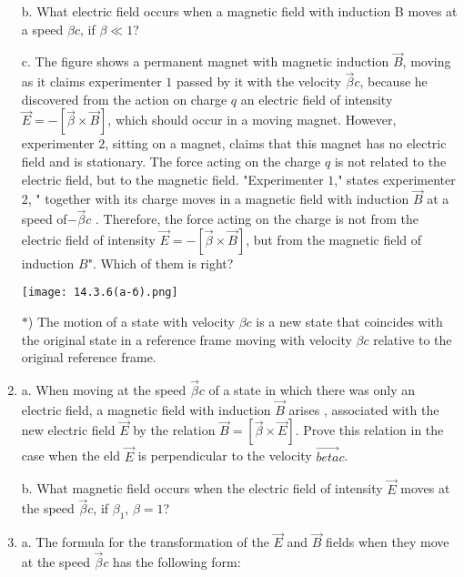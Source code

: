 \documentclass{article}
\begin{document}
\begin{enumerate}[label=14.3.\arabic*]
b. What electric field occurs when a magnetic field with induction B moves at a speed $\beta c$, if $\beta \ll 1$?

c. The figure shows a permanent magnet with magnetic induction $\overrightarrow{B}$, moving as it claims experimenter $1$ passed by it with the velocity $\overrightarrow{\beta}c$, because he discovered from the action on charge $q$ an electric field of intensity $\overrightarrow{E} = -[\overrightarrow{\beta} \times \overrightarrow{B} ]$, which should occur in a moving magnet. However, experimenter $2$, sitting on a magnet, claims that this magnet has no electric field and is stationary. The force acting on the charge $q$ is not related to the electric field, but to the magnetic field. "Experimenter $1$," states experimenter $2$, " together with its charge moves in a magnetic field with induction $\overrightarrow{B}$ at a speed of$- \overrightarrow{\beta} c$ . Therefore, the force acting on the charge is not from the electric field of intensity $\overrightarrow{E} = -[\overrightarrow{\beta} \times \overrightarrow{B}]$, but from the magnetic field of induction $B$". Which of them is right? 

\begin{center}
    \texttt{[image: 14.3.6(а-б).png]}
\end{center}

$\ast$) The motion of a state with velocity $\beta c$ is a new state that coincides with the original state in a reference frame moving with velocity $\beta c$ relative to the original reference frame.

\item a. When moving at the speed $\overrightarrow{\beta}c$ of a state in which there was only an electric field, a magnetic field with induction $\overrightarrow{B}$ arises , associated with the new electric field $\overrightarrow{E}$ by the relation $\overrightarrow{B} = [\overrightarrow{\beta} \times \overrightarrow{E} ]$. Prove this relation in the case when the eld $\overrightarrow{E}$ is perpendicular to the velocity $\overrightarrow{beta} c$. 

b. What magnetic field occurs when the electric field of intensity $\overrightarrow{E}$ moves at the speed $\overrightarrow{\beta} c$, if $\beta_1$, $\beta = 1$?


\item a. The formula for the transformation of the $\overrightarrow{E}$ and $\overrightarrow{B}$ fields when they move at the speed $\overrightarrow{\beta} c$ has the following form:


\end{enumerate}
\end{document}
